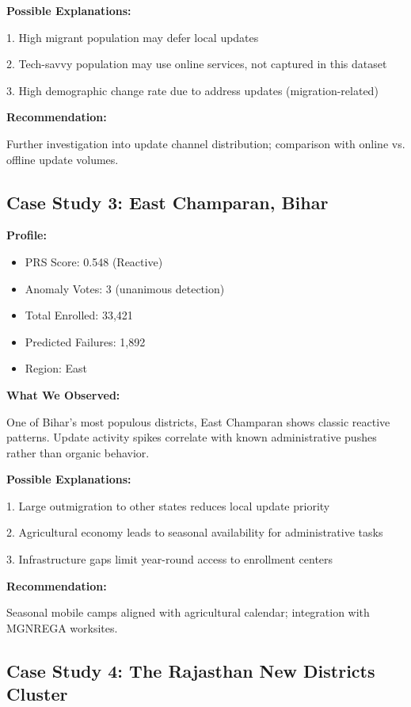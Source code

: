 \documentclass[11pt, a4paper]{article}
\begin{document}
\textbf{Possible Explanations:}


1. High migrant population may defer local updates

2. Tech-savvy population may use online services, not captured in this dataset

3. High demographic change rate due to address updates (migration-related)


\textbf{Recommendation:}

Further investigation into update channel distribution; comparison with online vs. offline update volumes.




\subsection{Case Study 3: East Champaran, Bihar}

\textbf{Profile:}


\begin{itemize}
\item PRS Score: 0.548 (Reactive)

\item Anomaly Votes: 3 (unanimous detection)

\item Total Enrolled: 33,421

\item Predicted Failures: 1,892

\item Region: East
\end{itemize}

\textbf{What We Observed:}

One of Bihar's most populous districts, East Champaran shows classic reactive patterns. Update activity spikes correlate with known administrative pushes rather than organic behavior.


\textbf{Possible Explanations:}


1. Large outmigration to other states reduces local update priority

2. Agricultural economy leads to seasonal availability for administrative tasks

3. Infrastructure gaps limit year-round access to enrollment centers


\textbf{Recommendation:}

Seasonal mobile camps aligned with agricultural calendar; integration with MGNREGA worksites.




\subsection{Case Study 4: The Rajasthan New Districts Cluster}
\end{document}
